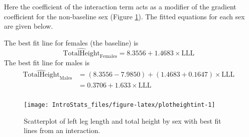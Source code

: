 \documentclass[
  oneside]{krantz}
\newenvironment{Shaded}{\begin{snugshade}}{\end{snugshade}}
\newcommand{\AttributeTok}[1]{\textcolor[rgb]{0.77,0.63,0.00}{#1}}
\newcommand{\CommentTok}[1]{\textcolor[rgb]{0.56,0.35,0.01}{\textit{#1}}}
\newcommand{\DecValTok}[1]{\textcolor[rgb]{0.00,0.00,0.81}{#1}}
\newcommand{\FloatTok}[1]{\textcolor[rgb]{0.00,0.00,0.81}{#1}}
\newcommand{\FunctionTok}[1]{\textcolor[rgb]{0.00,0.00,0.00}{#1}}
\newcommand{\NormalTok}[1]{#1}
\newcommand{\SpecialCharTok}[1]{\textcolor[rgb]{0.00,0.00,0.00}{#1}}
\newcommand{\StringTok}[1]{\textcolor[rgb]{0.31,0.60,0.02}{#1}}
\begin{document}
Here the coefficient of the interaction term acts as a modifier of the gradient coefficient for the non-baseline sex (Figure \ref{fig:plotheightint}). The fitted equations for each sex are given below.

The best fit line for females (the baseline) is
\[\mathrm{\widehat{TotalHeight}_{Females}} = 8.3556 + 1.4683 \times \mathrm{LLL}\]
The best fit line for males is
\begin{align}
\mathrm{\widehat{TotalHeight}_{Males}} &= (8.3556 -7.9850) + (1.4683+0.1647) \times \mathrm{LLL}\\
& = 0.3706 + 1.633 \times \mathrm{LLL}\\
\end{align}

\newpage

\begin{Shaded}
\end{Shaded}

\begin{figure}

{\centering \texttt{[image: IntroStats\_files/figure-latex/plotheightint-1]} 

}

\caption{Scatterplot of left leg length and total height by sex with best fit lines from an interaction.}\label{fig:plotheightint}
\end{figure}
\end{document}
